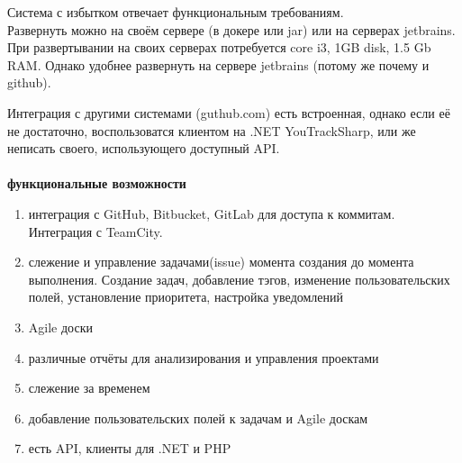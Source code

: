 \documentclass{article}
\begin{document}

Система с избытком отвечает функциональным требованиям.\\
Развернуть можно на своём сервере (в докере или jar) или на серверах jetbrains.
При развертывании на своих серверах потребуется core i3, 1GB disk, 1.5 Gb RAM. \cite{youtrack_requirements}
Однако удобнее развернуть на сервере jetbrains (потому же почему и github).

Интеграция с другими системами (guthub.com) есть встроенная, однако если её не достаточно, воспользоватся клиентом на .NET
YouTrackSharp, или же неписать своего, использующего доступный API.
\\\\
\textbf{функциональные возможности \cite{youtrack}}
\begin{enumerate}
    \item{интеграция с GitHub, Bitbucket, GitLab для доступа к коммитам. Интеграция с TeamCity.}
    \item{слежение и управление задачами(issue) момента создания до момента выполнения. Создание задач, добавление тэгов, изменение пользовательских полей, установление приоритета, настройка уведомлений}
    \item{Agile доски}
    \item{различные отчёты для анализирования и управления проектами}
    
    \item{слежение за временем}
    \item{добавление пользовательских полей к задачам и Agile доскам}
    \item{есть API, клиенты для .NET и PHP}
\end{enumerate}
\end{document}
